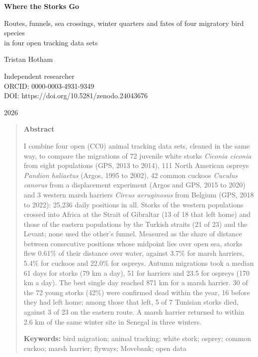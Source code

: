 \documentclass[11pt,a4paper]{article}
\begin{document}
\begin{center}
{\Large\bfseries Where the Storks Go\par}
\vspace{0.4em}
{\large Routes, funnels, sea crossings, winter quarters and fates of four migratory bird species\\in four open tracking data sets\par}
\vspace{1.2em}
{\large Tristan Hotham\par}
\vspace{0.3em}
{\small Independent researcher\\
ORCID: 0000-0003-4931-9349\\
DOI: https://doi.org/10.5281/zenodo.24043676\par}
\vspace{0.8em}
2026
\end{center}

\begin{quote}
\small
\begin{center}\textbf{Abstract}\end{center}
I combine four open (CC0) animal tracking data sets, cleaned in the same way, to compare the migrations of 72 juvenile white storks \textit{Ciconia ciconia} from eight populations (GPS, 2013 to 2014), 111 North American ospreys \textit{Pandion haliaetus} (Argos, 1995 to 2002), 42 common cuckoos \textit{Cuculus canorus} from a displacement experiment (Argos and GPS, 2015 to 2020) and 3 western marsh harriers \textit{Circus aeruginosus} from Belgium (GPS, 2018 to 2022): 25,236 daily positions in all. Storks of the western populations crossed into Africa at the Strait of Gibraltar (13 of 18 that left home) and those of the eastern populations by the Turkish straits (21 of 23) and the Levant; none used the other's funnel. Measured as the share of distance between consecutive positions whose midpoint lies over open sea, storks flew 0.61\% of their distance over water, against 3.7\% for marsh harriers, 5.4\% for cuckoos and 22.0\% for ospreys. Autumn migrations took a median 61 days for storks (79 km a day), 51 for harriers and 23.5 for ospreys (170 km a day). The best single day reached 871 km for a marsh harrier. 30 of the 72 young storks (42\%) were confirmed dead within the year, 16 before they had left home; among those that left, 5 of 7 Tunisian storks died, against 3 of 23 on the eastern route. A marsh harrier returned to within 2.6 km of the same winter site in Senegal in three winters.

\textbf{Keywords:} bird migration; animal tracking; white stork; osprey; common cuckoo; marsh harrier; flyways; Movebank; open data
\end{quote}
\end{document}
